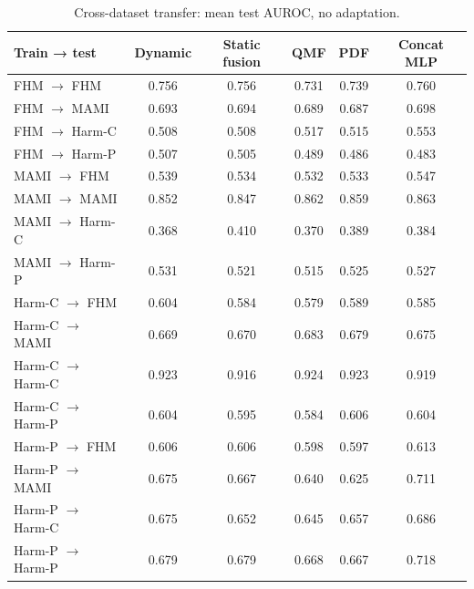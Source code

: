 \begin{table}[t]
\centering
\caption{Cross-dataset transfer: mean test AUROC, no adaptation.}
\label{tab:transfer}
\begin{tabular}{lccccc}
\toprule
Train → test & Dynamic & Static fusion & QMF & PDF & Concat MLP \\
\midrule
FHM $\to$ FHM & 0.756 & 0.756 & 0.731 & 0.739 & 0.760 \\
FHM $\to$ MAMI & 0.693 & 0.694 & 0.689 & 0.687 & 0.698 \\
FHM $\to$ Harm-C & 0.508 & 0.508 & 0.517 & 0.515 & 0.553 \\
FHM $\to$ Harm-P & 0.507 & 0.505 & 0.489 & 0.486 & 0.483 \\
MAMI $\to$ FHM & 0.539 & 0.534 & 0.532 & 0.533 & 0.547 \\
MAMI $\to$ MAMI & 0.852 & 0.847 & 0.862 & 0.859 & 0.863 \\
MAMI $\to$ Harm-C & 0.368 & 0.410 & 0.370 & 0.389 & 0.384 \\
MAMI $\to$ Harm-P & 0.531 & 0.521 & 0.515 & 0.525 & 0.527 \\
Harm-C $\to$ FHM & 0.604 & 0.584 & 0.579 & 0.589 & 0.585 \\
Harm-C $\to$ MAMI & 0.669 & 0.670 & 0.683 & 0.679 & 0.675 \\
Harm-C $\to$ Harm-C & 0.923 & 0.916 & 0.924 & 0.923 & 0.919 \\
Harm-C $\to$ Harm-P & 0.604 & 0.595 & 0.584 & 0.606 & 0.604 \\
Harm-P $\to$ FHM & 0.606 & 0.606 & 0.598 & 0.597 & 0.613 \\
Harm-P $\to$ MAMI & 0.675 & 0.667 & 0.640 & 0.625 & 0.711 \\
Harm-P $\to$ Harm-C & 0.675 & 0.652 & 0.645 & 0.657 & 0.686 \\
Harm-P $\to$ Harm-P & 0.679 & 0.679 & 0.668 & 0.667 & 0.718 \\
\bottomrule
\end{tabular}
\end{table}

